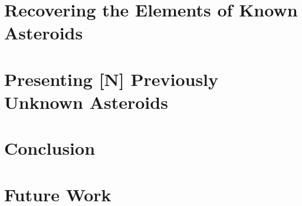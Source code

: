 \section{Recovering the Elements of Known Asteroids}
\label{section_results_known_ast}

\section{Presenting [N] Previously Unknown Asteroids}
\label{section_results_unknown_ast}

\section{Conclusion}
\label{search_conclusion}

\section{Future Work}
\label{section_future_work}

